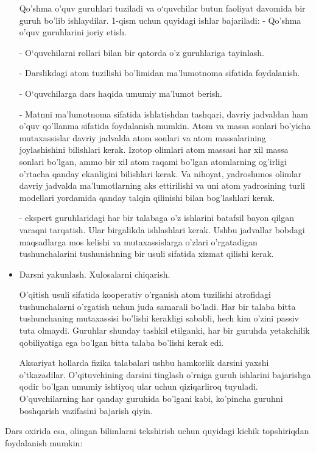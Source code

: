 \documentclass[epsf]{article}
\begin{document}
\begin{itemize}
Qo'shma o'quv guruhlari tuziladi va o`quvchilar butun faoliyat davomida bir guruh bo'lib ishlaydilar. 1-qism uchun quyidagi ishlar bajariladi:
- Qo'shma o'quv guruhlarini joriy etish.

- O`quvchilarni rollari bilan bir qatorda o'z guruhlariga tayinlash.

- Darslikdagi atom tuzilishi bo'limidan ma'lumotnoma sifatida foydalanish.

- O`quvchilarga dars haqida umumiy ma'lumot berish.

- Matnni ma'lumotnoma sifatida ishlatishdan tashqari, davriy jadvaldan ham o'quv qo'llanma sifatida foydalanish mumkin. Atom va massa sonlari bo'yicha mutaxassislar davriy jadvalda atom sonlari va atom massalarining joylashishini bilishlari kerak. Izotop olimlari atom massasi har xil massa sonlari bo'lgan, ammo bir xil atom raqami bo'lgan atomlarning og'irligi o'rtacha qanday ekanligini bilishlari kerak. Va nihoyat, yadroshunos olimlar davriy jadvalda ma'lumotlarning aks ettirilishi va uni atom yadrosining turli modellari yordamida qanday talqin qilinishi bilan bog'lashlari kerak.

- ekspert guruhlaridagi har bir talabaga o'z ishlarini batafsil bayon qilgan varaqni tarqatish. Ular birgalikda ishlashlari kerak. Ushbu jadvallar bobdagi maqsadlarga mos kelishi va mutaxassislarga o'zlari o'rgatadigan tushunchalarini tushunishning bir usuli sifatida xizmat qilishi kerak.

\item Darsni yakunlash. Xulosalarni chiqarish.

O'qitish usuli sifatida kooperativ o'rganish atom tuzilishi atrofidagi tushunchalarni o'rgatish uchun juda samarali bo'ladi. Har bir talaba bitta tushunchaning mutaxassisi bo'lishi kerakligi sababli, hech kim o'zini passiv tuta olmaydi. Guruhlar shunday tashkil etilganki, har bir guruhda yetakchilik qobiliyatiga ega bo'lgan bitta talaba bo'lishi kerak edi.

Aksariyat hollarda fizika talabalari ushbu hamkorlik darsini yaxshi o'tkazadilar. O'qituvchining darsini tinglash o'rniga guruh ishlarini bajarishga qodir bo'lgan umumiy ishtiyoq ular uchun qiziqarliroq tuyuladi. O'quvchilarning har qanday guruhida bo'lgani kabi, ko'pincha guruhni boshqarish vazifasini bajarish qiyin. 
\end{itemize}

Dars oxirida esa, olingan bilimlarni tekshirish uchun quyidagi kichik topshiriqdan foydalanish mumkin:
\end{document}
